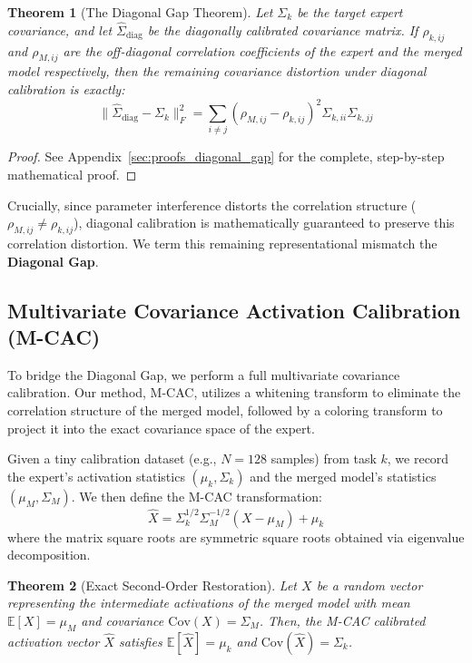\documentclass{article}
\theoremstyle{plain}
\newtheorem{theorem}{Theorem}[section]
\theoremstyle{definition}
\theoremstyle{remark}
\begin{document}
\begin{theorem}[The Diagonal Gap Theorem]
Let $\Sigma_k$ be the target expert covariance, and let $\hat{\Sigma}_{\text{diag}}$ be the diagonally calibrated covariance matrix. If $\rho_{k,ij}$ and $\rho_{M,ij}$ are the off-diagonal correlation coefficients of the expert and the merged model respectively, then the remaining covariance distortion under diagonal calibration is exactly:
\begin{equation}
  \|\hat{\Sigma}_{\text{diag}} - \Sigma_k\|_F^2 = \sum_{i \neq j} (\rho_{M,ij} - \rho_{k,ij})^2 \Sigma_{k,ii} \Sigma_{k,jj}
\end{equation}
\end{theorem}

\begin{proof}
See Appendix~\ref{sec:proofs_diagonal_gap} for the complete, step-by-step mathematical proof.
\end{proof}

Crucially, since parameter interference distorts the correlation structure ($\rho_{M,ij} \neq \rho_{k,ij}$), diagonal calibration is mathematically guaranteed to preserve this correlation distortion. We term this remaining representational mismatch the \textbf{Diagonal Gap}.


\subsection{Multivariate Covariance Activation Calibration (M-CAC)}
To bridge the Diagonal Gap, we perform a full multivariate covariance calibration. Our method, M-CAC, utilizes a whitening transform to eliminate the correlation structure of the merged model, followed by a coloring transform to project it into the exact covariance space of the expert.

Given a tiny calibration dataset (e.g., $N=128$ samples) from task $k$, we record the expert's activation statistics $(\mu_k, \Sigma_k)$ and the merged model's statistics $(\mu_M, \Sigma_M)$. We then define the M-CAC transformation:
\begin{equation}
  \hat{X} = \Sigma_k^{1/2} \Sigma_M^{-1/2} (X - \mu_M) + \mu_k
\end{equation}
where the matrix square roots are symmetric square roots obtained via eigenvalue decomposition.

\begin{theorem}[Exact Second-Order Restoration]
  Let $X$ be a random vector representing the intermediate activations of the merged model with mean $\mathbb{E}[X] = \mu_M$ and covariance $\text{Cov}(X) = \Sigma_M$. Then, the M-CAC calibrated activation vector $\hat{X}$ satisfies $\mathbb{E}[\hat{X}] = \mu_k$ and $\text{Cov}(\hat{X}) = \Sigma_k$.
\end{theorem}
\end{document}

